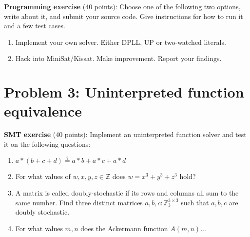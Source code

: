 \documentclass[11pt]{article}
\begin{document}
    \noindent \textbf{Programming exercise} (40 points): Choose one of the following two options, write about it, and submit your source code. Give instructions for how to run it and a few test cases.

    \begin{enumerate}
    \item Implement your own solver. Either DPLL, UP or two-watched literals.
    \item Hack into MiniSat/Kissat. Make improvement. Report your findings.
    \end{enumerate}

    \section {Problem 3: Uninterpreted function equivalence}

    \noindent \textbf{SMT exercise} (40 points): Implement an uninterpreted function solver and test it on the following questions:\\

    \begin{enumerate}
    \item $a * (b + c + d) \overset{?}{=} a * b + a * c + a * d$
    \item For what values of $w, x, y, z \in \mathbb{Z}$ does $w = x^3+y^3+z^3$ hold?
    \item A matrix is called doubly-stochastic if its rows and columns all sum to the same number. Find three distinct matrices $a, b, c: \mathbb{Z}_3^{3\times 3}$ such that $a, b, c$ are doubly stochastic.
        \item For what values $m, n$ does the Ackermann function $A(m, n)$...
    \end{enumerate}
\end{document}
